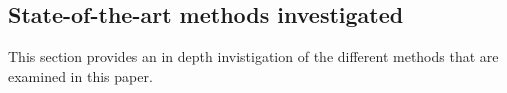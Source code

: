 \subsection{State-of-the-art methods investigated}\label{subsec:sotaoverview}
This section provides an in depth invistigation of the different methods that are examined in this paper.





